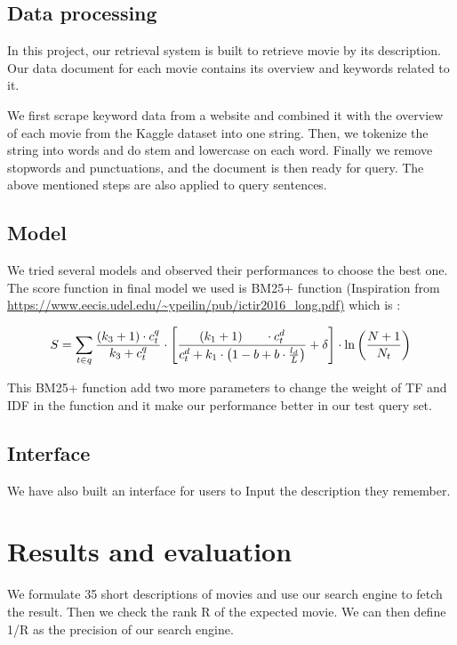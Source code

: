 \documentclass[letterpaper,10pt]{article}
\begin{document}
\begin{multicols}{2}
    \subsection{Data processing}

    In this project, our retrieval system is built to retrieve movie by its description.
    Our data document for each movie contains its overview and keywords related to it.

    We first scrape keyword data from a website and combined it with the overview of each movie from the Kaggle dataset into one string. Then,  we tokenize the string into words and do stem and lowercase on each word. Finally we remove stopwords and punctuations, and  the document is then ready for query. The above mentioned steps are also applied to query sentences.

    \subsection{Model}

    We tried several models and observed their performances to choose the best one. The score function in final model we used is BM25+ function (Inspiration from \url{https://www.eecis.udel.edu/~ypeilin/pub/ictir2016_long.pdf)} which is :

    {
    \tiny
    $$
        S = \sum_{t \in q} \frac{\left(k_{3}+1\right) \cdot c_{t}^{q}}{k_{3}+c_{t}^{q}} \cdot\left[\frac{\left(k_{1}+1\right) \\ \cdot c_{t}^{d}}{c_{t}^{d}+k_{1} \cdot\left(1-b+b \cdot \frac{l_{d}}{L}\right)}+\delta\right] \cdot \ln \left(\frac{N+1}{N_{t}}\right)
    $$
    }


    This BM25+ function add two more parameters to change the weight of TF and IDF in the function and it make our performance better in our test query set.

    \subsection{Interface }

    We have also built an interface for users to Input the description they remember.

    \section{Results and evaluation}

    We formulate 35 short descriptions of movies and use our search engine to fetch the result. Then we check the rank R of the expected movie. We can then define 1/R as the precision of our search engine.


\end{multicols}
\end{document}
